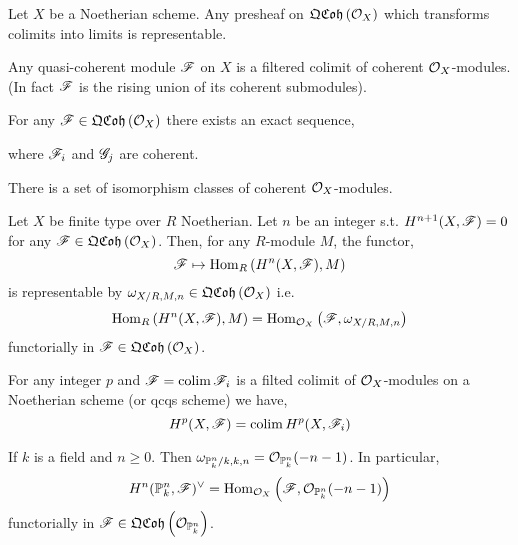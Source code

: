 \documentclass[12pt]{article}
\begin{document}
\begin{lemma}
Let $X$ be a Noetherian scheme. Any presheaf on $\mathfrak{QCoh}\left(\mathcal{O}_{X}\right)$ which transforms colimits into limits is representable.
\end{lemma}

\begin{lemma}
Any quasi-coherent module $\mathscr{F}$ on $X$ is a filtered colimit of coherent $\mathcal{O}_{X}$-modules. (In fact $\mathscr{F}$ is the rising union of its coherent submodules). 
\end{lemma}

\begin{cor}
For any $\mathscr{F} \in \mathfrak{QCoh}\left(\mathcal{O}_{X}\right)$ there exists an exact sequence,
\begin{center}
\end{center}
where $\mathscr{F}_i$ and $\mathscr{G}_j$ are coherent. 
\end{cor}

\begin{lemma}
There is a set of isomorphism classes of coherent $\mathcal{O}_{X}$-modules.
\end{lemma}

\begin{prop}
Let $X$ be finite type over $R$ Noetherian. Let $n$ be an integer s.t. $H^{n+1}(X, \mathscr{F}) = 0$ for any $\mathscr{F} \in \mathfrak{QCoh}\left(\mathcal{O}_{X}\right)$. Then, for any $R$-module $M$, the functor,
\[ \mathscr{F} \mapsto \mathrm{Hom}_{R} \left( H^n(X, \mathscr{F}), M \right) \]
is representable by $\omega_{X/R,M,n} \in \mathfrak{QCoh}\left(\mathcal{O}_{X}\right)$ i.e.
\[ \mathrm{Hom}_{R} \left( H^n(X, \mathscr{F}), M \right) = \mathrm{Hom}_{\mathcal{O}_{X}} \left( \mathscr{F}, \omega_{X / R, M, n} \right) \]
functorially in $\mathscr{F} \in \mathfrak{QCoh}\left(\mathcal{O}_{X}\right)$. 
\end{prop}

\begin{rmk}
For any integer $p$ and $\mathscr{F} = \operatorname{\mathrm{colim}} \mathscr{F}_i$ is a filted colimit of $\mathcal{O}_{X}$-modules on a Noetherian scheme (or qcqs scheme) we have,
\[ H^p(X, \mathscr{F}) = \operatorname{\mathrm{colim}} H^p(X, \mathscr{F}_i) \]
\end{rmk}

\begin{thm}
If $k$ is a field and $n \ge 0$. Then $\omega_{\mathbb{P}^n_k/k, k, n} = \mathcal{O}_{\mathbb{P}^n_k}(-n-1)$. In particular,
\[ H^n(\mathbb{P}^n_k, \mathscr{F})^\vee = \mathrm{Hom}_{\mathcal{O}_{X}} \left( \mathscr{F}, \mathcal{O}_{\mathbb{P}^n_k}(-n-1) \right) \]
functorially in $\mathscr{F} \in \mathfrak{QCoh}\left(\mathcal{O}_{\mathbb{P}^n_k}\right)$.
\end{thm}
\end{document}

